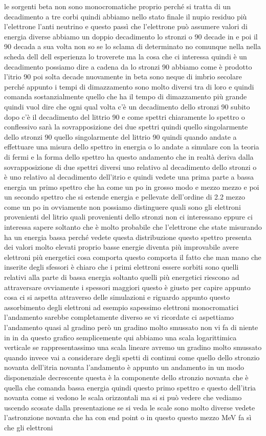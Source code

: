 le sorgenti beta non sono monocromatiche proprio perché si tratta di un decadimento a tre corbi quindi abbiamo nello stato finale il nupio residuo più l'elettrone l'anti neutrino e questo passì che l'elettrone può assumere valori di energia diverse abbiamo un doppio decadimento lo stronzi o 90 decade in e poi il 90 decada a sua volta non so se lo sclama di determinato no comunque nella nella scheda dell dell esperienza lo troverete ma la cosa che ci interessa quindi è un decadimento possiamo dire a cadena da lo stronzi 90 abbiamo come è prodotto l'itrio 90 poi solta decade nuovamente in beta sono neque di imbrio secolare perché appunto i tempi di dimazzamento sono molto diversi tra di loro e quindi comanda sostanzialmente quello che ha il tempo di dimazzamento più grande quindi vuol dire che ogni qual volta c'è un decadimento dello stronzi 90 subito dopo c'è il decadimento del littrio 90 e come spettri chiaramente lo spettro o conflessivo sarà la sovrapposizione dei due spettri quindi quello singolarmente dello stronzi 90 quello singolarmente del littrio 90 quindi quando andate a effettuare una misura dello spettro in energia o lo andate a simulare con la teoria di fermi e la forma dello spettro ha questo andamento che in realtà deriva dalla sovrapposizione di due spettri diversi uno relativo al decadimento dello stronzi o è uno relativo al decadimento dell'itrio e quindi vedete una prima parte a bassa energia un primo spettro che ha come un po in grosso modo e mezzo mezzo e poi un secondo spettro che si estende energia e pellevate dell'ordine di 2.2 mezzo come un po in ovviamente non possiamo distinguere quali sono gli elettroni provenienti del litrio quali provenienti dello stronzi non ci interessano eppure ci interessa sapere soltanto che è molto probabile che l'elettrone che state misurando ha un energia bassa perché vedete questa distribuzione questo spettro presenta dei valori molto elevati proprio basse energie diventa più improvabile avere elettroni più energetici cosa comporta questo comporta il fatto che man mano che inserite degli sfessori è chiaro che i primi elettroni essere sorbiti sono quelli relativi alla parte di bassa energia soltanto quelli più energetici riescono ad attraversare ovviamente i spessori maggiori questo è giusto per capire appunto cosa ci si aspetta attraverso delle simulazioni e riguardo appunto questo assorbimento degli elettroni ad esempio sapessimo elettroni monocromatici l'andamento sarebbe completamente diverso se vi ricordate ci aspettiamo l'andamento quasi al gradino però un gradino molto smussato non vi fa di niente in in da questo grafico semplicemente qui abbiamo una scala logarittimica verticale se rappresentassimo una scala lineare avremo un gradino molto smussato quando invece vai a considerare degli spetti di continui come quello dello stronzio novanta dell'itria novanta l'andamento è appunto un andamento in un modo disponenziale decrescente questa è la componente dello stronzio novanta che è quella che comanda bassa energia quindi questo primo spettro e questo dell'itria novanta come si vedono le scala orizzontali ma si si può vedere che vediamo uscendo scosate dalla presentazione se si veda le scale sono molto diverse vedete l'astronzione novanta che ha con end point o in questo questo mezzo MeV fa sì che gli elettroni 